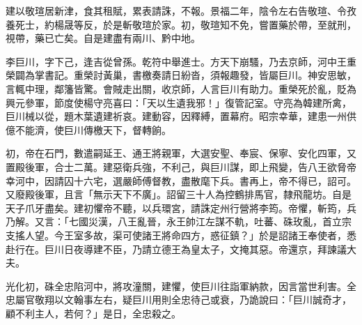 \begin{pinyinscope}
 建以敬瑄居新津，食其租賦，累表請誅，不報。景福二年，陰令左右告敬瑄、令孜養死士，約楊晟等反，於是斬敬瑄於家。初，敬瑄知不免，嘗置藥於帶，至就刑，視帶，藥已亡矣。自是建盡有兩川、黔中地。



 李巨川，字下己，逢吉從曾孫。乾符中舉進士。方天下崩騷，乃去京師，河中王重榮闢為掌書記。重榮討黃巢，書檄奏請日紛沓，須報趣發，皆屬巨川。神安思敏，言輒中理，鄰籓皆驚。會賊走出關，收京師，人言巨川有助力。重榮死於亂，貶為興元參軍，節度使楊守亮喜曰：「天以生遺我邪！」復管記室。守亮為韓建所禽，巨川械以從，題木葉遺建祈哀。建動容，因釋縛，置幕府。昭宗幸華，建患一州供億不能濟，使巨川傳檄天下，督轉餉。



 初，帝在石門，數遣嗣延王、通王將親軍，大選安聖、奉宸、保寧、安化四軍，又置殿後軍，合士二萬。建惡衛兵強，不利己，與巨川謀，即上飛變，告八王欲脅帝幸河中，因請囚十六宅，選嚴師傅督教，盡散麾下兵。書再上，帝不得已，詔可。又廢殿後軍，且言「無示天下不廣」。詔留三十人為控鶴排馬官，隸飛龍坊。自是天子爪牙盡矣。建初懼帝不聽，以兵環宮，請誅定州行營將李筠。帝懼，斬筠，兵乃解。又言：「七國災漢，八王亂晉，永王帥江左謀不軌，吐蕃、硃玫亂，首立宗支搖人望。今王室多故，渠可使諸王將命四方，惑征鎮？」於是詔諸王奉使者，悉赴行在。巨川日夜導建不臣，乃請立德王為皇太子，文掩其惡。帝還京，拜諫議大夫。



 光化初，硃全忠陷河中，將攻潼關，建懼，使巨川往詣軍納款，因言當世利害。全忠屬官敬翔以文翰事左右，疑巨川用則全忠待己或衰，乃詭說曰：「巨川誠奇才，顧不利主人，若何？」是日，全忠殺之。



\end{pinyinscope}